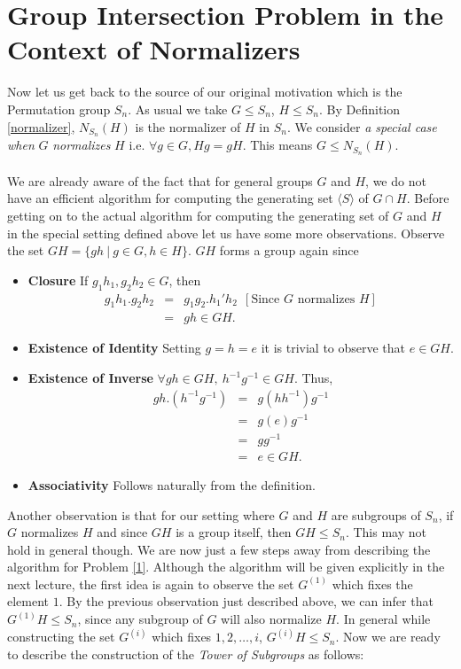 \section{Group Intersection Problem in the Context of Normalizers}
Now let us get back to the source of our original motivation which is the Permutation group $S_n$. As usual we take $G\leq S_n$, $H\leq S_n$. By Definition \ref{normalizer}, $N_{S_{n}}(H)$ is the normalizer of $H$ in $S_n$. We consider \emph{a special case when} $G$ \emph{normalizes} $H$ i.e. $\forall g\in G, Hg = gH$. This means $G\leq N_{S_{n}}(H)$.\\\\We are already aware of the fact that for general groups $G$ and $H$, we do not have an efficient algorithm for computing the generating set $\langle S\rangle$ of $G\cap H$. Before getting on to the actual algorithm for computing the generating set of $G$ and $H$ in the special setting defined above let us have some more observations. Observe the set $GH = \{gh~|~g\in G, h\in H\}$. $GH$ forms a group again since
\begin{itemize}
	\item {\bf Closure} If $g_1h_1,g_2h_2\in G$, then
	\begin{eqnarray*}
		g_1h_1.g_2h_2 &=& g_1g_2.h_1'h_2~~ [\text{Since }G\text{ normalizes }H]\\
		&=&gh\in GH.
	\end{eqnarray*}
	\item {\bf Existence of Identity} Setting $g = h = e$ it is trivial to observe that $e\in GH$.
	\item {\bf Existence of Inverse} $\forall gh\in GH,~ h^{-1}g^{-1}\in GH$. Thus,
	\begin{eqnarray*}
		gh.(h^{-1}g^{-1}) &=& g(hh^{-1})g^{-1}\\
						  &=& g(e)g^{-1}\\
						  &=& gg^{-1}\\
						  &=& e\in GH.
	\end{eqnarray*} 
	\item {\bf Associativity} Follows naturally from the definition.
\end{itemize}
Another observation is that for our setting where $G$ and $H$ are subgroups of $S_n$, if $G$ normalizes $H$ and since $GH$ is a group itself, then $GH\leq S_n$. This may not hold in general though. We are now just a few steps away from describing the algorithm for Problem \ref{1}. Although the algorithm will be given explicitly in the next lecture, the first idea is again to observe the set $G^{(1)}$ which fixes the element $1$. By the previous observation just described above, we can infer that $G^{(1)}H\leq S_n$, since any subgroup of $G$ will also normalize $H$. In general while constructing the set $G^{(i)}$ which fixes $1,2,\ldots,i$, $G^{(i)}H\leq S_n$. Now we are ready to describe the construction of the \emph{Tower of Subgroups} as follows:
